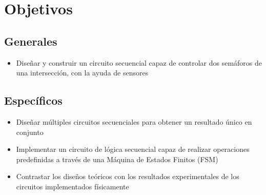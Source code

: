 
\section*{Objetivos}
\subsection*{Generales}
\begin{itemize}
    \item Diseñar y construir un circuito secuencial capaz de controlar dos semáforos de una intersección, con la ayuda de sensores
\end{itemize}

\subsection*{Específicos}
\begin{itemize}
    \item Diseñar múltiples circuitos secuenciales para obtener un resultado único en conjunto
    \item Implementar un circuito de lógica secuencial capaz de realizar operaciones predefinidas a través de una Máquina de Estados Finitos (FSM)
    \item Contrastar los diseños teóricos con los resultados experimentales de los circuitos implementados físicamente
\end{itemize}



